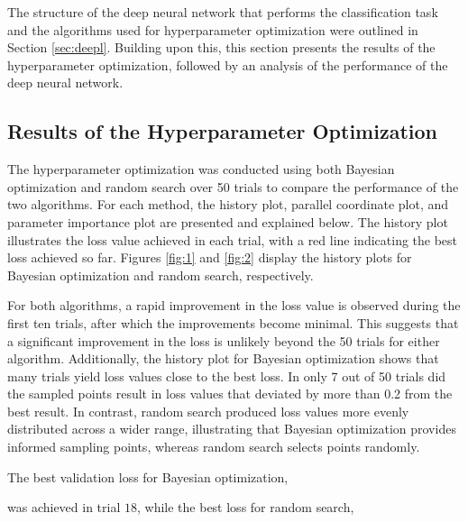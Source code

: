 \label{sec:results}

The structure of the deep neural network that performs the classification task and the algorithms used for hyperparameter optimization were outlined in Section \ref{sec:deepl}. Building upon this,
this section presents the results of the hyperparameter optimization, followed by an analysis of the performance of the deep neural network.

\subsection{Results of the Hyperparameter Optimization}
\label{subsec:perfmlp}

The hyperparameter optimization was conducted using both Bayesian optimization and random search over 50 trials to compare the performance of the two algorithms.
For each method, the history plot, parallel coordinate plot, and parameter importance plot are presented and explained below. The history plot illustrates the loss value achieved in each trial,
with a red line indicating the best loss achieved so far. Figures \ref{fig:1} and \ref{fig:2} display the history plots for Bayesian optimization and random search, respectively.


For both algorithms, a rapid improvement in the loss value is observed during the first ten trials, after which the improvements become minimal.
This suggests that a significant improvement in the loss is unlikely beyond the 50 trials for either algorithm. Additionally, the history plot for Bayesian optimization shows that many trials
yield loss values close to the best loss. In only 7 out of 50 trials did the sampled points result in loss values that deviated by more than 0.2 from the best result. In contrast, random search produced loss
values more evenly distributed across a wider range, illustrating that Bayesian optimization provides informed sampling points, whereas random search selects points randomly.

The best validation loss for Bayesian optimization,


was achieved in trial $18$, while the best loss for random search,


